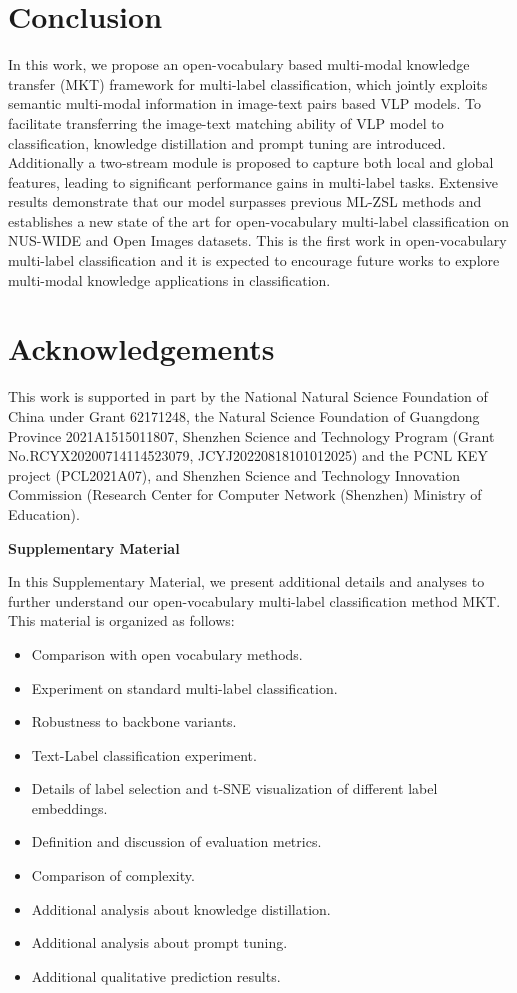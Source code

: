 \documentclass[letterpaper]{article} \usepackage{aaai23}  \usepackage{times}  \usepackage{helvet}  \usepackage{courier}  \usepackage[hyphens]{url}  \usepackage{graphicx} \urlstyle{rm} \def\UrlFont{\rm}  \usepackage{natbib}  \usepackage{caption} \frenchspacing  \setlength{\pdfpagewidth}{8.5in}  \setlength{\pdfpageheight}{11in}
\begin{document}
\section{Conclusion}
In this work, we propose an open-vocabulary based multi-modal knowledge transfer (MKT) framework for multi-label classification, which jointly exploits semantic multi-modal information in image-text pairs based VLP models.
To facilitate transferring the image-text matching ability of VLP model to classification, knowledge distillation and prompt tuning are introduced.
Additionally a two-stream module is proposed to capture both local and global features, leading to significant performance gains in multi-label tasks.
Extensive results demonstrate that our model surpasses previous ML-ZSL methods and establishes a new state of the art for open-vocabulary multi-label classification on NUS-WIDE and Open Images datasets.
This is the first work in open-vocabulary multi-label classification and it is expected to encourage future works to explore multi-modal knowledge applications in classification. \section{Acknowledgements}
This work is supported in part by the National Natural Science Foundation of China under Grant 62171248, the Natural Science Foundation of Guangdong Province 2021A1515011807, Shenzhen Science and Technology Program (Grant No.RCYX20200714114523079, JCYJ20220818101012025) and the PCNL KEY project (PCL2021A07), and Shenzhen Science and Technology Innovation Commission (Research Center for Computer Network (Shenzhen) Ministry of Education). 

\clearpage
\appendix
\begin{center} \begin{Large}{\textbf{Supplementary Material}} \end{Large} 
\vspace{10pt}
\end{center}
In this Supplementary Material, we present additional details and analyses to further understand our open-vocabulary multi-label classification method MKT.
This material is organized as follows:
\begin{itemize}
    \item Comparison with open vocabulary methods.
    \item Experiment on standard multi-label classification.
\item Robustness to backbone variants.
    \item Text-Label classification experiment.
    \item Details of label selection and t-SNE visualization of different label embeddings.
    \item Definition and discussion of evaluation metrics. 
    \item Comparison of complexity. 
    \item Additional analysis about knowledge distillation. 
    \item Additional analysis about prompt tuning.
    \item Additional qualitative prediction results. 
\end{itemize}
\end{document}
